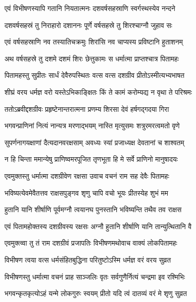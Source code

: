 \twolineshloka
{एवं विभीषणस्यापि गतानि नियतात्मनः}
{दशवर्षसहस्राणि स्वर्गस्थस्येव नन्दने} %

\twolineshloka
{दशवर्षसहस्रं तु निराहारो दशाननः}
{पूर्णे वर्षसहस्रे तु शिरश्चाग्नौ जुहाव सः} %

\twolineshloka
{एवं वर्षसहस्राणि नव तस्यातिचक्रमुः}
{शिरांसि नव चाप्यस्य प्रविष्टानि हुताशनम्} %

\twolineshloka
{अथ वर्षसहस्रे तु दशमे दशमं शिरः}
{छेत्तुकामः स धर्मात्मा प्राप्तश्चात्र पितामहः} %

\twolineshloka
{पितामहस्तु सुप्रीतः सार्धं देवैरुपस्थितः}
{वत्स वत्स दशग्रीव प्रीतोऽस्मीत्यभ्यभाषत} %

\twolineshloka
{शीघ्रं वरय धर्मज्ञ वरो यस्तेऽभिकाङ्क्षितः}
{किं ते कामं करोम्यद्य न वृथा ते परिश्रमः} %

\twolineshloka
{ततोऽब्रवीद्दशग्रीवः प्रहृष्टेनान्तरात्मना}
{प्रणम्य शिरसा देवं हर्षगद्गदया गिरा} %

\twolineshloka
{भगवन्प्राणिनां नित्यं नान्यत्र मरणाद्भयम्}
{नास्ति मृत्युसमः शत्रुरमरत्वमतो वृणे} %

\twolineshloka
{सुपर्णनागयक्षाणां दैत्यदानवरक्षसाम्}
{अवध्यः स्यां प्रजाध्यक्ष देवतानां च शाश्वतम्} %

\twolineshloka
{न हि चिन्ता ममान्येषु प्राणिष्वमरपूजित}
{तृणभूता हि मे सर्वे प्राणिनो मानुषादयः} %

\twolineshloka
{एवमुक्तस्तु धर्मात्मा दशग्रीवेण रक्षसा}
{उवाच वचनं राम सह देवैः पितामहः} %

\twolineshloka
{भविष्यत्येवमेवैतत्तव राक्षसपुङ्गव}
{शृणु चापि वचो भूयः प्रीतस्येह शुभं मम} %

\twolineshloka
{हुतानि यानि शीर्षाणि पूर्वमग्नौ त्वयानघ}
{पुनस्तानि भविष्यन्ति तथैव तव राक्षस} %

\twolineshloka
{एवं पितामहोक्तस्य दशग्रीवस्य रक्षसः}
{अग्नौ हुतानि शीर्षाणि यानि तान्युत्थितानि वै} %

\twolineshloka
{एवमुक्त्व्वा तु तं राम दशग्रीवं प्रजापतिः}
{विभीषणमथोवाच वाक्यं लोकपितामहः} %

\twolineshloka
{विभीषण त्वया वत्स धर्मसंहितबुद्धिना}
{परितुष्टोऽस्मि धर्मज्ञ वरं वरय सुव्रत} %

\twolineshloka
{विभीषणस्तु धर्मात्मा वचनं प्राह साञ्जलिः}
{वृतः सर्वगुणैर्नित्यं चन्द्रमा इव रश्मिभिः} %

\twolineshloka
{भगवन्कृतकृत्योऽहं यन्मे लोकगुरुः स्वयम्}
{प्रीतो यदि त्वं दातव्यं वरं मे शृणु सुव्रत} %

